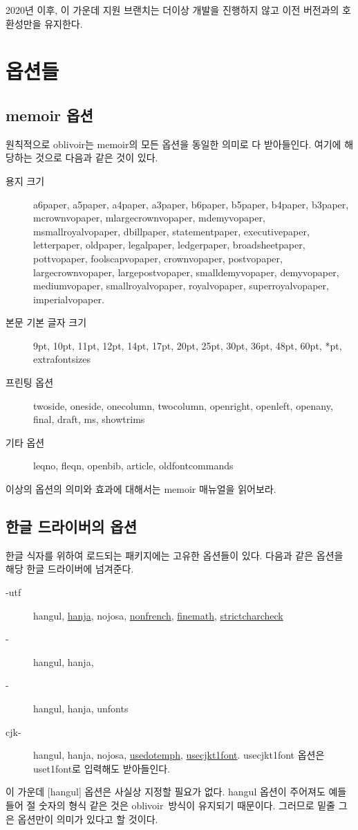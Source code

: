 \documentclass[
	12pt,
	a4paper,
	kosection,
	footnote,
	microtype,
	figtabcapt,
]{oblivoir}
\newcommand\obclass{ob\-liv\-oir\oblivoirallowbreak}
\begin{document}
2020년 이후, 이 가운데  지원 브랜치는 더이상 개발을 진행하지 않고
이전 버전과의 호환성만을 유지한다.

\section{옵션들}

\subsection{memoir 옵션}

원칙적으로 oblivoir는 memoir의 모든 옵션을 동일한 의미로 다 받아들인다. 여기에 해당하는 것으로 
다음과 같은 것이 있다. 
\begin{description}
\item[용지 크기] a6paper, a5paper, a4paper, a3paper, b6paper, b5paper, b4paper, b3paper, mcrownvopaper, mlargecrownvopaper, mdemyvopaper, msmallroyalvopaper, dbillpaper, statementpaper, executivepaper, letterpaper, oldpaper, legalpaper, ledgerpaper, broadsheetpaper, pottvopaper, foolscapvopaper, crownvopaper, postvopaper, largecrownvopaper, largepostvopaper, smalldemyvopaper, demyvopaper, mediumvopaper, smallroyalvopaper, royalvopaper, superroyalvopaper, imperialvopaper.
\item[본문 기본 글자 크기] 9pt, 10pt, 11pt, 12pt, 14pt, 17pt, 20pt, 25pt, 30pt, 36pt, 48pt, 60pt, *pt, extrafontsizes
\item[프린팅 옵션] twoside, oneside, onecolumn, twocolumn, openright, openleft, openany, final, draft,
ms, showtrims
\item[기타 옵션] leqno, fleqn, openbib, article, oldfontcommands
\end{description}
이상의 옵션의 의미와 효과에 대해서는 memoir 매뉴얼을 읽어보라.

\subsection{한글 드라이버의 옵션}

한글 식자를 위하여 로드되는 패키지에는 고유한 옵션들이 있다.  다음과 같은 옵션을 해당
한글 드라이버에 넘겨준다.

\begin{description}
\item [\koTeX-utf] hangul, \uline{hanja}, nojosa, \uline{nonfrench}, \uline{finemath}, \uline{strictcharcheck}
\item [\XeTeX-\ko] hangul, hanja, %
\item [\LuaTeX-\ko] hangul, hanja, unfonts
\item [cjk-\ko] hangul, hanja, nojosa, \uline{usedotemph}, \uline{usecjkt1font}. usecjkt1font 옵션은 uset1font로 입력해도 받아들인다.
\end{description}
이 가운데 [hangul] 옵션은 사실상 지정할 필요가 없다. hangul 옵션이 주어져도 예들 들어 절 숫자의 형식 같은 것은 \obclass\ 방식이 유지되기 때문이다. 그러므로 밑줄 그은 옵션만이  의미가 있다고 할 것이다.
\end{document}
